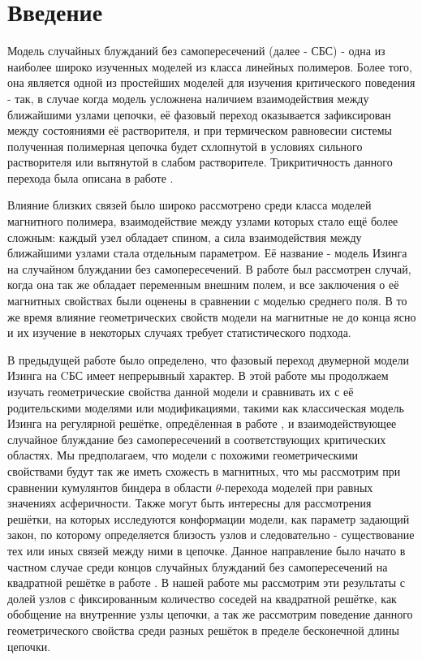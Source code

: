 \section{Введение}

Модель случайных блужданий без самопересечений (далее - СБС) - одна из наиболее широко изученных моделей из класса линейных полимеров. 
Более того, она является одной из простейших моделей для изучения критического поведения - так, в случае когда модель усложнена наличием взаимодействия между ближайшими узлами цепочки, её фазовый переход оказывается зафиксирован между состояниями её растворителя, и при термическом равновесии системы полученная полимерная цепочка будет схлопнутой в условиях сильного растворителя или вытянутой в слабом растворителе.
Трикритичность данного перехода была описана в работе \cite{Gennes1979}.

Влияние близких связей было широко рассмотрено среди класса моделей магнитного полимера, взаимодействие между узлами которых стало ещё более сложным:
каждый узел обладает спином, а сила взаимодействия между ближайшими узлами стала отдельным параметром. 
Её название - модель Изинга на случайном блуждании без самопересечений.
В работе \cite{Garel1999} был рассмотрен случай, когда она так же обладает переменным внешним полем, и все заключения о её магнитных свойствах были оценены в сравнении с моделью среднего поля.
В то же время влияние геометрических свойств модели на магнитные не до конца ясно и их изучение в некоторых случаях требует статистического подхода.

В предыдущей работе \cite{faizullina2021critical} было определено, что фазовый переход двумерной модели Изинга на CБС
имеет непрерывный характер. 
В этой работе мы продолжаем изучать геометрические свойства данной модели и сравнивать их с её родительскими моделями или модификациями, такими как классическая модель Изинга на регулярной решётке, опредёленная в работе \cite{selke2006critical}, и взаимодействующее случайное блуждание без самопересечений в соответствующих критических областях. 
Мы предполагаем, что модели с похожими геометрическими свойствами будут так же иметь схожесть в магнитных, что мы рассмотрим при сравнении кумулянтов биндера в области $\theta$-перехода моделей при равных значениях асферичности.
Также могут быть интересны для рассмотрения решётки, на которых исследуются конформации модели, как параметр задающий закон, по которому определяется близость узлов и следовательно - существование тех или иных связей между ними в цепочке. 
Данное направление было начато в частном случае среди концов случайных блужданий без самопересечений на квадратной решётке в работе \cite{owczarek2008scaling}. 
В нашей работе мы рассмотрим эти результаты с долей узлов с фиксированным количество соседей на квадратной решётке, как обобщение на внутренние узлы цепочки, а так же рассмотрим поведение данного геометрического свойства среди разных решёток в пределе бесконечной длины цепочки.  

